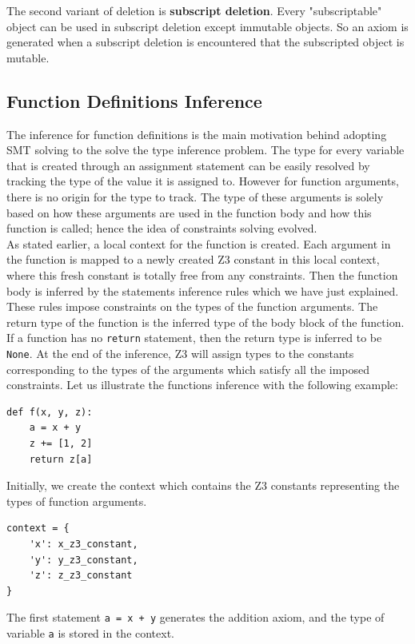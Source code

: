 The second variant of deletion is \textbf{subscript deletion}. Every "subscriptable" object can be used in subscript deletion except immutable objects. So an axiom is generated when a subscript deletion is encountered that the subscripted object is mutable.
\subsection{Function Definitions Inference}\label{func}
The inference for function definitions is the main motivation behind adopting SMT solving to the solve the type inference problem. The type for every variable that is created through an assignment statement can be easily resolved by tracking the type of the value it is assigned to. However for function arguments, there is no origin for the type to track. The type of these arguments is solely based on how these arguments are used in the function body and how this function is called; hence the idea of constraints solving evolved.\\

As stated earlier, a local context for the function is created. Each argument in the function is mapped to a newly created Z3 constant in this local context, where this fresh constant is totally free from any constraints. Then the function body is inferred by the statements inference rules which we have just explained. These rules impose constraints on the types of the function arguments. The return type of the function is the inferred type of the body block of the function. If a function has no \lstinline|return| statement, then the return type is inferred to be \lstinline|None|. At the end of the inference, Z3 will assign types to the constants corresponding to the types of the arguments which satisfy all the imposed constraints. Let us illustrate the functions inference with the following example:

\begin{lstlisting}
def f(x, y, z):
	a = x + y
	z += [1, 2]
	return z[a]	
\end{lstlisting}

Initially, we create the context which contains the Z3 constants representing the types of function arguments.

\begin{lstlisting}
context = {
	'x': x_z3_constant,
	'y': y_z3_constant,
	'z': z_z3_constant
}
\end{lstlisting}

The first statement \lstinline|a = x + y| generates the addition axiom, and the type of variable \lstinline|a| is stored in the context.

